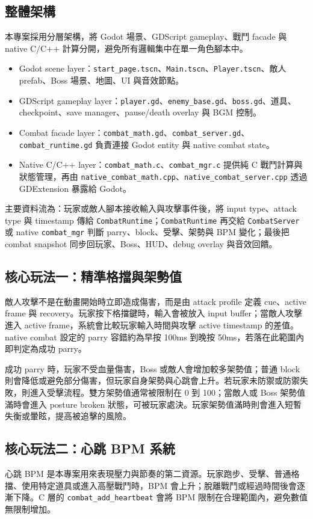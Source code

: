 \documentclass[12pt,a4paper]{article}
\begin{document}
\subsection{整體架構}
本專案採用分層架構，將 Godot 場景、GDScript gameplay、戰鬥 facade 與 native C/C++ 計算分開，避免所有邏輯集中在單一角色腳本中。
\begin{itemize}[leftmargin=2em]
  \item Godot scene layer：\texttt{start\_page.tscn}、\texttt{Main.tscn}、\texttt{Player.tscn}、敵人 prefab、Boss 場景、地圖、UI 與音效節點。
  \item GDScript gameplay layer：\texttt{player.gd}、\texttt{enemy\_base.gd}、\texttt{boss.gd}、道具、checkpoint、save manager、pause/death overlay 與 BGM 控制。
  \item Combat facade layer：\texttt{combat\_math.gd}、\texttt{combat\_server.gd}、\texttt{combat\_runtime.gd} 負責連接 Godot entity 與 native combat state。
  \item Native C/C++ layer：\texttt{combat\_math.c}、\texttt{combat\_mgr.c} 提供純 C 戰鬥計算與狀態管理，再由 \texttt{native\_combat\_math.cpp}、\texttt{native\_combat\_server.cpp} 透過 GDExtension 暴露給 Godot。
\end{itemize}

主要資料流為：玩家或敵人腳本接收輸入與攻擊事件後，將 input type、attack type 與 timestamp 傳給 \texttt{CombatRuntime}；\texttt{CombatRuntime} 再交給 \texttt{CombatServer} 或 native \texttt{combat\_mgr} 判斷 parry、block、受擊、架勢與 BPM 變化；最後把 combat snapshot 同步回玩家、Boss、HUD、debug overlay 與音效回饋。

\subsection{核心玩法一：精準格擋與架勢值}
敵人攻擊不是在動畫開始時立即造成傷害，而是由 attack profile 定義 cue、active frame 與 recovery。玩家按下格擋鍵時，輸入會被放入 input buffer；當敵人攻擊進入 active frame，系統會比較玩家輸入時間與攻擊 active timestamp 的差值。native combat 設定的 parry 容錯約為早按 100ms 到晚按 50ms，若落在此範圍內即判定為成功 parry。

成功 parry 時，玩家不受血量傷害，Boss 或敵人會增加較多架勢值；普通 block 則會降低或避免部分傷害，但玩家自身架勢與心跳會上升。若玩家未防禦或防禦失敗，則進入受擊流程。雙方架勢值通常被限制在 0 到 100；當敵人或 Boss 架勢值滿時會進入 posture broken 狀態，可被玩家處決。玩家架勢值滿時則會進入短暫失衡或暈眩，提高被追擊的風險。

\subsection{核心玩法二：心跳 BPM 系統}
心跳 BPM 是本專案用來表現壓力與節奏的第二資源。玩家跑步、受擊、普通格擋、使用特定道具或進入高壓戰鬥時，BPM 會上升；脫離戰鬥或經過時間後會逐漸下降。C 層的 \texttt{combat\_add\_heartbeat} 會將 BPM 限制在合理範圍內，避免數值無限制增加。
\end{document}
